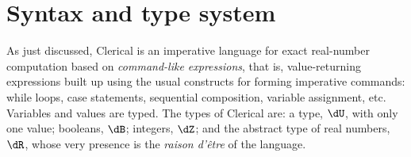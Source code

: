 \section{Syntax and type system}
\label{sec:syntax}

As just discussed, Clerical is an imperative language for exact real-number computation based on \emph{command-like expressions}, that is, value-returning expressions built up using the usual constructs  for forming imperative commands: while loops, case statements, sequential composition, variable assignment, etc. Variables and values are typed. The types of Clerical are:
a   type, $\dU$, with only one value; booleans, $\dB$; integers, $\dZ$; and the abstract type of real numbers, $\dR$, whose 
very presence is the \emph{raison d'\^{e}tre} of the language. 

